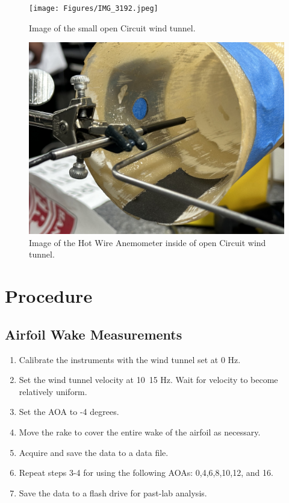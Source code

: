 \begin{figure}[htpb]
    \centering
    \texttt{[image: Figures/IMG\_3192.jpeg]}
    \caption[Image of the small open Circuit wind tunnel.]{Image of the small open Circuit wind tunnel.}
    \label{fig: OpenCircutWindTunnel}
\end{figure}

\begin{figure}[htpb]
    \centering
    \includegraphics[width=0.75\linewidth]{Figures/IMG_3199.jpeg}
    \caption[Image of the Hot Wire Anemometer inside of open Circuit wind tunnel.]{Image of the Hot Wire Anemometer inside of open Circuit wind tunnel.}
    \label{fig: HotWireAndPitot}
\end{figure}

\section{Procedure}\label{sec:procedures}
\subsection{Airfoil Wake Measurements}
\begin{enumerate}
\item Calibrate the instruments with the wind tunnel set at 0 Hz.
\item Set the wind tunnel velocity at 10~15 Hz. Wait for velocity to become relatively uniform. 
\item Set the AOA to -4 degrees. 
\item Move the rake to cover the entire wake of the airfoil as necessary.
\item Acquire and save the data to a data file.
\item Repeat steps 3-4 for using the following AOAs: 0,4,6,8,10,12, and 16.
\item Save the data to a flash drive for past-lab analysis.
\end{enumerate}

